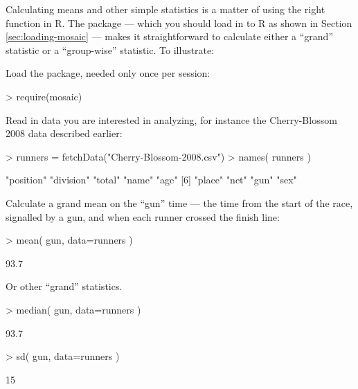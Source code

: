 


Calculating means and other simple statistics is a matter of using the
right function in R.  The  package --- which you should
load in to R as shown in Section \ref{sec:loading-mosaic} --- makes it
straightforward to calculate either a ``grand'' statistic or a
``group-wise'' statistic.   To illustrate:

\noindent Load the  package, needed only once per session:
\begin{Schunk}
\begin{Sinput}
> require(mosaic) 
\end{Sinput}
\end{Schunk}

\noindent Read in data you are interested in analyzing, for instance
the Cherry-Blossom 2008 data described earlier: \datasetCherryBlossomEight
\begin{Schunk}
\begin{Sinput}
> runners = fetchData("Cherry-Blossom-2008.csv")
> names( runners )
\end{Sinput}
\begin{Soutput}
[1] "position" "division" "total"    "name"     "age"     
[6] "place"    "net"      "gun"      "sex"     
\end{Soutput}
\end{Schunk}

\noindent Calculate a grand mean on the ``gun'' time --- the time from
the start of the race, signalled by a gun, and when each runner
crossed the finish line:
\begin{Schunk}
\begin{Sinput}
> mean( gun, data=runners )
\end{Sinput}
\begin{Soutput}
[1] 93.7
\end{Soutput}
\end{Schunk}
\noindent Or other ``grand'' statistics.

\begin{Schunk}
\begin{Sinput}
> median( gun, data=runners )
\end{Sinput}
\begin{Soutput}
[1] 93.7
\end{Soutput}
\begin{Sinput}
> sd( gun, data=runners )
\end{Sinput}
\begin{Soutput}
[1] 15
\end{Soutput}
\end{Schunk}

